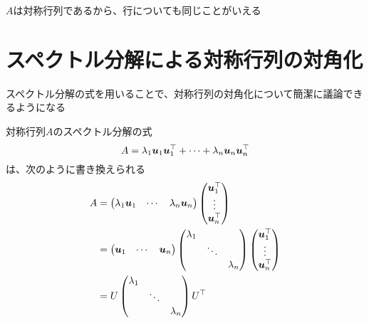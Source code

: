 \documentclass[../../../topic_linear-algebra]{subfiles}
\begin{document}
$A$は対称行列であるから、行についても同じことがいえる

\sectionline
\section{スペクトル分解による対称行列の対角化}

スペクトル分解の式を用いることで、対称行列の対角化について簡潔に議論できるようになる

\br

対称行列$A$のスペクトル分解の式
\begin{equation*}
  A = \lambda_1 \vb*{u}_1 \vb*{u}_1^\top + \cdots + \lambda_n \vb*{u}_n \vb*{u}_n^\top
\end{equation*}
は、次のように書き換えられる
\begin{align*}
  A & = \begin{pmatrix}
          \lambda_1\vb*{u}_1 & \cdots & \lambda_n\vb*{u}_n
        \end{pmatrix} \begin{pmatrix}
                        \vb*{u}_1^\top \\
                        \vdots         \\
                        \vb*{u}_n^\top
                      \end{pmatrix} \\
    & = \begin{pmatrix}
          \vb*{u}_1 & \cdots & \vb*{u}_n
        \end{pmatrix} \begin{pmatrix}
                        \lambda_1 &        &           \\
                                  & \ddots &           \\
                                  &        & \lambda_n
                      \end{pmatrix} \begin{pmatrix}
                                      \vb*{u}_1^\top \\
                                      \vdots         \\
                                      \vb*{u}_n^\top
                                    \end{pmatrix}     \\
    & = U \begin{pmatrix}
            \lambda_1 &        &           \\
                      & \ddots &           \\
                      &        & \lambda_n
          \end{pmatrix} U^\top
\end{align*}
\end{document}
